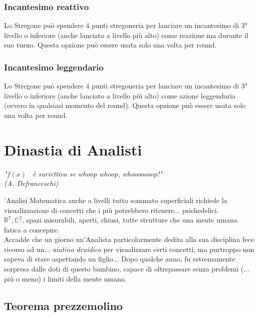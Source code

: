 \subsubsection{Incantesimo reattivo}
Lo Stregone può spendere 4 punti stregoneria per lanciare un incantesimo di 3° livello o inferiore (anche lanciato a livello più alto) come reazione ma durante il suo turno. Questa opzione può essere usata solo una volta per round.

\subsubsection*{Incantesimo leggendario}
Lo Stregone può spendere 4 punti stregoneria per lanciare un incantesimo di 3° livello o inferiore (anche lanciato a livello più alto) come azione leggendaria (ovvero in qualsiasi momento del round). Questa opzione può essere usata solo una volta per round.

\section{Dinastia di Analisti}

\begin{DndReadAloud}
  \it
  "\begin{math}f(x)\end{math} \ è suriettiva se whoop whoop, whooooooop!" \\ (A. Defranceschi)
\end{DndReadAloud}

'Analisi Matematica anche a livelli tutto sommato superficiali richiede la visualizzazione di concetti che i più potrebbero ritenere... psichedelici. \\ \begin{math} \mathbb{R}^7, \mathbb{C}^2\end{math}, spazi misurabili, aperti, chiusi, tutte strutture che una mente umana fatica a concepire. \\ Accadde che un giorno un'Analista particolarmente dedita alla sua disciplina fece ricorso ad un... \textit{aiutino druidico} per visualizzare certi concetti, ma purtroppo non sapeva di stare aspettando un figlio... Dopo qualche anno, fu estremamente sorpresa dalle doti di questo bambino, capace di oltrepassare senza problemi (... più o meno) i limiti della mente umana.

\subsection{Teorema prezzemolino}

